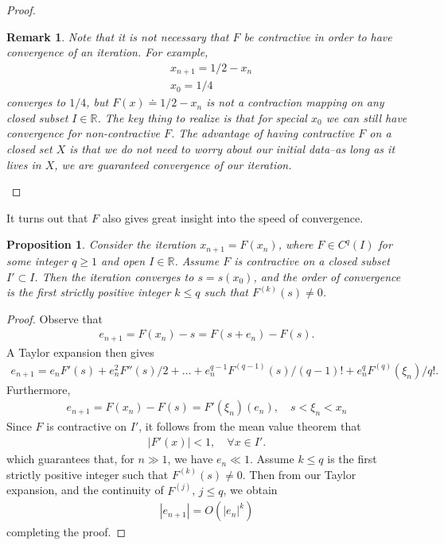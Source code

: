 \documentclass[12pt,reqno]{amsart}
\numberwithin{equation}{section}  %
\newcommand{\rr}{\mathbb{R}}
\newtheorem{proposition}[theorem]{Proposition}
\newtheorem{remark}[theorem]{Remark}
\begin{document}
\begin{proof}
\begin{remark}
Note that it is not necessary that $F$ be contractive in order to 
have convergence of an iteration. For example,
\begin{align*}
& x_{n+1} = 1/2 - x_n
\\
& x_0 = 1/4
\end{align*}
converges to $1/4$, but $F(x) \doteq 1/2 - x_n$ is not a contraction mapping
on any closed subset $I \in \rr$. The key thing to realize is that
for \emph{special} $x_0$ we can still have convergence for non-contractive $F$.
The advantage of having contractive $F$ on a closed set $X$ is that we do not need to worry
about our initial data--as long as it lives in $X$,
we are guaranteed convergence of our iteration.
\end{remark}
\end{proof}
It turns out that $F$ also gives great insight into the speed
of convergence.
\begin{proposition}
Consider the iteration $x_{n+1} = F(x_n)$, where $F \in C^{q}(I)$ for some integer
$q \ge 1$ and open $I \in \rr$. Assume $F$ is contractive on a closed subset $I' \subset I$.
Then the iteration
converges to $s = s(x_0)$, and the order of convergence is the first strictly positive integer $k \le q$
such that $F^{(k)}(s) \neq 0$.
\end{proposition}
\begin{proof}
Observe that
\begin{align*}
e_{n+1} = F(x_n) - s = F(s + e_n) - F(s).
\end{align*}
A Taylor expansion then gives
\begin{align*}
e_{n+1} = e_nF'(s) + e_n^2 F''(s)/2 + \ldots + e_n^{q-1}F^{(q-1)}(s)/(q-1)! + 
e_n^q F^{(q)}(\xi_n)/q!.
\end{align*}
Furthermore,
\begin{align*}
e_{n+1} = F(x_n) - F(s) = F'(\xi_n)(e_n), \quad s < \xi_n < x_n
\end{align*}
Since $F$ is contractive on $I'$, it follows from the mean value theorem that 
\begin{align*}
| F'(x) | < 1, \quad \forall x \in I'.
\end{align*}
which guarantees that, for $n \gg 1$, we have $e_n \ll 1$. Assume $k \le q$ 
is the first strictly positive integer such that $F^{(k)}(s) \neq 0$. Then from our
Taylor expansion, and the continuity of $F^{(j)}$, $j \le q$, we obtain
\begin{align*}
|e_{n+1}| = O(|e_n|^k)
\end{align*}
completing the proof.
\end{proof}
\end{document}
